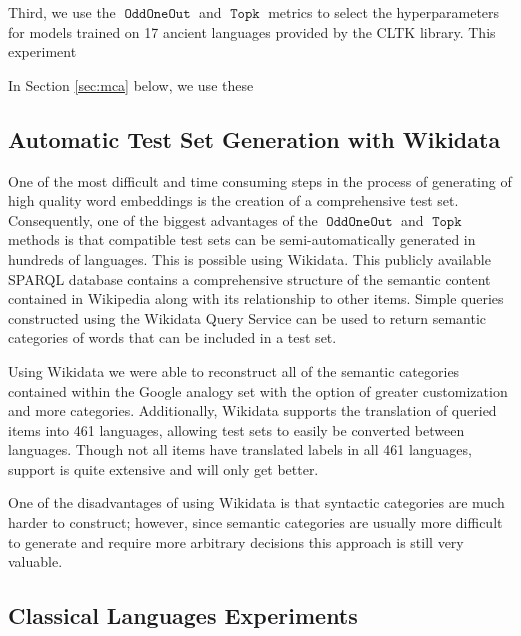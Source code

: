 \documentclass[11pt,a4paper]{article}
\DeclareMathOperator{\OddOneOut}{\texttt{OddOneOut}}
\DeclareMathOperator{\topk}{\texttt{Topk}}
\begin{document}
Third, we use the $\OddOneOut$ and $\topk$ metrics to select the hyperparameters for models trained on 17 ancient languages provided by the CLTK \cite{} library.
This experiment 

In Section \ref{sec:mca} below, we use these 

\subsection{Automatic Test Set Generation with Wikidata}

One of the most difficult and time consuming steps in the process of generating of high quality word embeddings is the creation of a comprehensive test set.
 Consequently, one of the biggest advantages of the $\OddOneOut$ and $\topk$ methods is that compatible test sets can be semi-automatically generated in hundreds of languages.
This is possible using Wikidata. 
This publicly available SPARQL database contains a comprehensive structure of the semantic content contained in Wikipedia
along with its relationship to other items.
Simple queries constructed using the Wikidata Query Service can be used to return semantic categories of words that can be included in a test set.

Using Wikidata we were able to reconstruct all of the semantic categories contained within the Google analogy set with the option of greater customization and more categories.
 Additionally, Wikidata supports the translation of queried items into 461 languages, allowing test sets to easily be converted between languages.
  Though not all items have translated labels in all 461 languages, support is quite extensive and will only get better. 

One of the disadvantages of using Wikidata is that syntactic categories are much harder to construct;
 however, since semantic categories are usually more difficult to generate 
 and require more arbitrary decisions this approach is still very valuable.

\subsection{Classical Languages Experiments}
\end{document}
